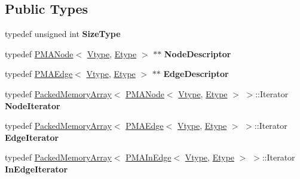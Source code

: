 \subsection*{Public Types}
\begin{DoxyCompactItemize}
\item 
\hypertarget{class_packed_memory_array_impl_a89e85c81f9ef46f5703bd3052c3f9bc5}{
typedef unsigned int {\bfseries SizeType}}
\label{class_packed_memory_array_impl_a89e85c81f9ef46f5703bd3052c3f9bc5}

\item 
\hypertarget{class_packed_memory_array_impl_a0375a23c81447f99bbb2ce3ce2a763a1}{
typedef \hyperlink{class_p_m_a_node}{PMANode}$<$ \hyperlink{class_vtype}{Vtype}, \hyperlink{class_etype}{Etype} $>$ $\ast$$\ast$ {\bfseries NodeDescriptor}}
\label{class_packed_memory_array_impl_a0375a23c81447f99bbb2ce3ce2a763a1}

\item 
\hypertarget{class_packed_memory_array_impl_a9a79ef4e91200a14e9ddef51f004c350}{
typedef \hyperlink{class_p_m_a_edge}{PMAEdge}$<$ \hyperlink{class_vtype}{Vtype}, \hyperlink{class_etype}{Etype} $>$ $\ast$$\ast$ {\bfseries EdgeDescriptor}}
\label{class_packed_memory_array_impl_a9a79ef4e91200a14e9ddef51f004c350}

\item 
\hypertarget{class_packed_memory_array_impl_a9b0f9796c4db3b50772952b7e66e424c}{
typedef \hyperlink{class_packed_memory_array}{PackedMemoryArray}$<$ \hyperlink{class_p_m_a_node}{PMANode}$<$ \hyperlink{class_vtype}{Vtype}, \hyperlink{class_etype}{Etype} $>$ $>$::Iterator {\bfseries NodeIterator}}
\label{class_packed_memory_array_impl_a9b0f9796c4db3b50772952b7e66e424c}

\item 
\hypertarget{class_packed_memory_array_impl_a3700b9d05ba9c5b8aac31d88c7b83cb3}{
typedef \hyperlink{class_packed_memory_array}{PackedMemoryArray}$<$ \hyperlink{class_p_m_a_edge}{PMAEdge}$<$ \hyperlink{class_vtype}{Vtype}, \hyperlink{class_etype}{Etype} $>$ $>$::Iterator {\bfseries EdgeIterator}}
\label{class_packed_memory_array_impl_a3700b9d05ba9c5b8aac31d88c7b83cb3}

\item 
\hypertarget{class_packed_memory_array_impl_a7d28674d20053b9cc3b5ffcb11fee483}{
typedef \hyperlink{class_packed_memory_array}{PackedMemoryArray}$<$ \hyperlink{class_p_m_a_in_edge}{PMAInEdge}$<$ \hyperlink{class_vtype}{Vtype}, \hyperlink{class_etype}{Etype} $>$ $>$::Iterator {\bfseries InEdgeIterator}}
\label{class_packed_memory_array_impl_a7d28674d20053b9cc3b5ffcb11fee483}

\end{DoxyCompactItemize}
